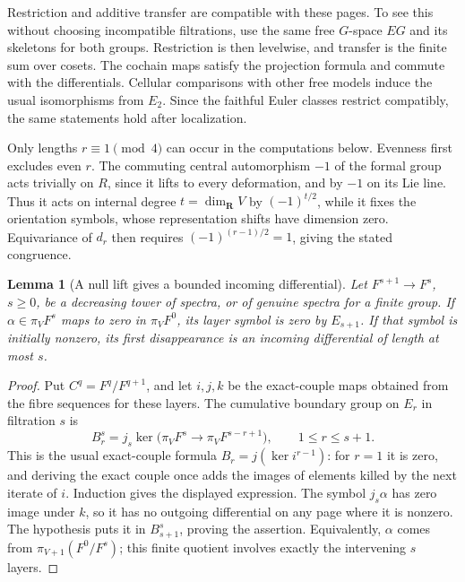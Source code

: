 \documentclass[11pt]{article}
\newtheorem{lemma}[theorem]{Lemma}
\theoremstyle{definition}
\theoremstyle{remark}
\numberwithin{equation}{section}
\begin{document}
Restriction and additive transfer are compatible with these
pages.  To see this without choosing incompatible filtrations,
use the same free \(G\)-space \(EG\) and its skeletons for both
groups.  Restriction is then levelwise, and transfer is the
finite sum over cosets.  The cochain maps satisfy the projection
formula and commute with the differentials.  Cellular
comparisons with other free models induce the usual
isomorphisms from \(E_2\).  Since the faithful Euler classes
restrict compatibly, the same statements hold after
localization.

Only lengths \(r\equiv1\pmod4\) can occur in the computations
below.  Evenness first excludes even \(r\).
The commuting central automorphism \(-1\) of the formal group
acts trivially on \(R\), since it lifts to every deformation,
and by \(-1\) on its Lie line.  Thus it acts on internal degree
\(t=\dim_{\mathbf R}V\) by \((-1)^{t/2}\), while it fixes the
orientation symbols, whose representation shifts have dimension zero.
Equivariance of \(d_r\) then requires
\((-1)^{(r-1)/2}=1\), giving the stated congruence.

\begin{lemma}[A null lift gives a bounded incoming differential]
\label{det:finite-boundary}
Let \(F^{s+1}\to F^s\), \(s\geq0\), be a decreasing tower of
spectra, or of genuine spectra for a finite group.
If \(\alpha\in\pi_VF^s\) maps to zero in \(\pi_VF^0\),
its layer symbol is zero by \(E_{s+1}\).
If that symbol is initially nonzero, its first disappearance
is an incoming differential of length at most \(s\).
\end{lemma}

\begin{proof}
Put \(C^q=F^q/F^{q+1}\), and let \(i,j,k\) be the exact-couple
maps obtained from the fibre sequences for these layers.
The cumulative boundary group on \(E_r\) in filtration \(s\)
is
\[
 B_r^s
 =j_s\ker\bigl(\pi_VF^s\longrightarrow
                       \pi_VF^{s-r+1}\bigr),
 \qquad 1\leq r\leq s+1.
\]
This is the usual exact-couple formula \(B_r=j(\ker i^{r-1})\):
for \(r=1\) it is zero, and deriving the exact couple once
adds the images of elements killed by the next iterate of
\(i\).  Induction gives the displayed expression.
The symbol \(j_s\alpha\) has zero image under \(k\), so it
has no outgoing differential on any page where it is
nonzero.  The hypothesis puts it in \(B_{s+1}^s\), proving
the assertion.
Equivalently, \(\alpha\) comes from
\(\pi_{V+1}(F^0/F^s)\); this finite quotient involves exactly
the intervening \(s\) layers.
\end{proof}
\end{document}

